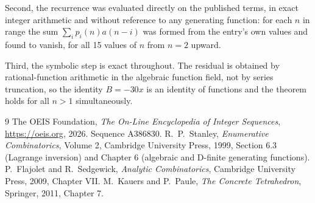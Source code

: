 \documentclass[11pt,a4paper]{article}
\theoremstyle{plain}
\theoremstyle{definition}
\begin{document}
Second, the recurrence was evaluated directly on the published terms, in exact integer
arithmetic and without reference to any generating function: for each $n$ in range the sum
$\sum_{i}p_{i}(n)a(n-i)$ was formed from the entry's own values and found to vanish, for
all 15 values of $n$ from $n=2$ upward.

Third, the symbolic step is exact throughout. The residual is obtained by
rational-function arithmetic in the algebraic function field, not by series truncation, so
the identity $B=- 30 x$ is an identity of functions and the theorem holds for all
$n>1$ simultaneously.

\begin{thebibliography}{9}
 The OEIS Foundation, \emph{The On-Line Encyclopedia of Integer Sequences},
\url{https://oeis.org}, 2026. Sequence A386830.
 R.~P.~Stanley, \emph{Enumerative Combinatorics}, Volume 2, Cambridge
University Press, 1999, Section 6.3 (Lagrange inversion) and Chapter 6 (algebraic and
D-finite generating functions).
 P.~Flajolet and R.~Sedgewick, \emph{Analytic Combinatorics}, Cambridge
University Press, 2009, Chapter VII.
 M.~Kauers and P.~Paule, \emph{The Concrete Tetrahedron}, Springer, 2011,
Chapter 7.
\end{thebibliography}
\end{document}
